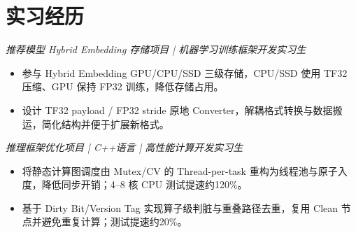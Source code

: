 \section{实习经历}
\textit{推荐模型 Hybrid Embedding 存储项目 | 机器学习训练框架开发实习生}
\begin{itemize}
  \item 参与 Hybrid Embedding GPU/CPU/SSD 三级存储，CPU/SSD 使用 TF32 压缩、GPU 保持 FP32 训练，降低存储占用。
  \item 设计 TF32 payload / FP32 stride 原地 Converter，解耦格式转换与数据搬运，简化结构并便于扩展新格式。
\end{itemize}
\textit{推理框架优化项目 | C++语言 | 高性能计算开发实习生}
\begin{itemize}
  \item 将静态计算图调度由 Mutex/CV 的 Thread-per-task 重构为线程池与原子入度，降低同步开销；4--8 核 CPU 测试提速约120\%。
  \item 基于 Dirty Bit/Version Tag 实现算子级判脏与重叠路径去重，复用 Clean 节点并避免重复计算；测试提速约20\%。
\end{itemize}
